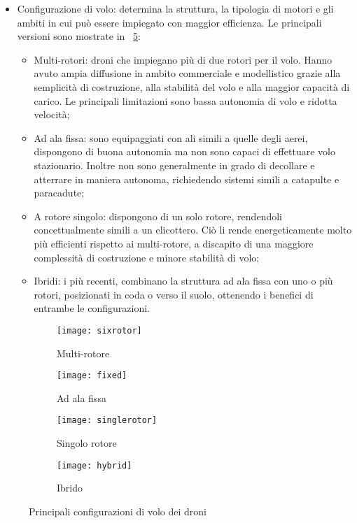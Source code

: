 \begin{itemize}
\begin{itemize}
		\end{itemize}
	\item Configurazione di volo: determina la struttura, la tipologia di motori e gli ambiti in cui può essere impiegato con maggior efficienza. Le principali versioni sono mostrate in \figurename\ \ref{fig:struttura}: 
		\begin{itemize}
			\item Multi-rotori: droni che impiegano più di due rotori per il volo. Hanno avuto ampia diffusione in ambito commerciale e modellistico grazie alla semplicità di costruzione, alla stabilità del volo e alla maggior capacità di carico. Le principali limitazioni sono bassa autonomia di volo e ridotta velocità;
			\item Ad ala fissa: sono equipaggiati con ali simili a quelle degli aerei, dispongono di buona autonomia ma non sono capaci di effettuare volo stazionario. Inoltre non sono generalmente in grado di decollare e atterrare in maniera autonoma, richiedendo sistemi simili a catapulte e paracadute;
			\item A rotore singolo: dispongono di un solo rotore, rendendoli concettualmente simili a un elicottero. Ciò li rende energeticamente molto più efficienti rispetto ai multi-rotore, a discapito di una maggiore complessità di costruzione e minore stabilità di volo;
			\item Ibridi: i più recenti, combinano la struttura ad ala fissa con uno o più rotori, posizionati in coda o verso il suolo, ottenendo i benefici di entrambe le configurazioni. 
		\end{itemize}
\end{itemize}

\begin{figure}
	\centering
	\begin{subfigure}[b]{0.4\textwidth}
		\centering
		\texttt{[image: sixrotor]}
		\caption{Multi-rotore}
		\label{fig:multirotor}
	\end{subfigure}
	\begin{subfigure}[b]{0.4\textwidth}
		\centering
		\texttt{[image: fixed]}
		\caption{Ad ala fissa}
		\label{fig:fixed}
	\end{subfigure}
	\begin{subfigure}[b]{0.4\textwidth}
		\centering
		\texttt{[image: singlerotor]}
		\caption{Singolo rotore}
		\label{fig:singlerotor}
	\end{subfigure}
	\begin{subfigure}[b]{0.4\textwidth}
		\centering
		\texttt{[image: hybrid]}
		\caption{Ibrido}
		\label{fig:hybrid}
	\end{subfigure}
	\caption{Principali configurazioni di volo dei droni}
	\label{fig:struttura}
\end{figure}




